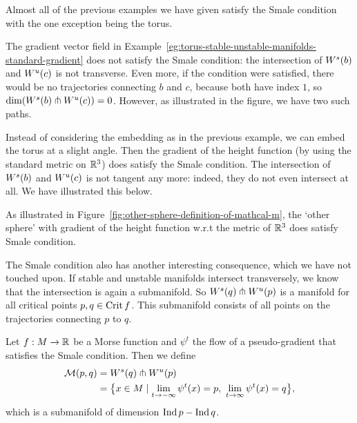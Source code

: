     Almost all of the previous examples we have given satisfy the Smale condition with the one exception being the torus.
    \begin{noneg}
        The gradient vector field in Example~\ref{eg:torus-stable-unstable-manifolds-standard-gradient} does not satisfy the Smale condition: the intersection of $W^s(b)$ and  $W^u(c)$ is not transverse.
        Even more, if the condition were satisfied, there would be no trajectories connecting $b$ and $c$, because both have index $1$, so $\dim (W^s(b) \pitchfork W^u(c)) = 0$. However, as illustrated in the figure, we have two such paths.
    \end{noneg}
    \begin{eg}
        Instead of considering the embedding as in the previous example, we can embed the torus at a slight angle.
        Then the gradient of the height function (by using the standard metric on $\mathbb{R}^3$) does satisfy the Smale condition.
        The intersection of $W^s(b)$ and  $W^u(c)$ is not tangent any more: indeed, they do not even intersect at all. We have illustrated this below.
        \label{eg:tilted-torus}
    \end{eg}
    \begin{figure}[H]
        \centering
    \end{figure}
    \begin{eg}
        As illustrated in Figure~\ref{fig:other-sphere-definition-of-mathcal-m}, the `other sphere' with gradient of the height function w.r.t the metric of $\mathbb{R}^3$ does satisfy Smale condition.  \end{eg}

The Smale condition also has another interesting consequence, which we have not touched upon.
If stable and unstable manifolds intersect transversely, we know that the intersection is again a submanifold.
So $W^s(q) \pitchfork W^u(p)$ is a manifold for all critical points $p, q \in \operatorname{Crit} f$.
This submanifold consists of all points on the trajectories connecting $p$ to $q$.
 \begin{definition}
    Let $f: M \to  \mathbb{R}$ be a Morse function and $\psi^{t}$ the flow of a pseudo-gradient that satisfies the Smale condition.
    Then we define
    \begin{align*}
        \traj{p}{q} &= \stable{q} \tcap \unstable{p}\\
                    &= \big\{
            x \in M 
            \mid 
            \lim_{t \to -\infty} \psi^{t}(x) = p, \ 
            \lim_{t \to \infty} \psi^{t}(x) = q
        \big\} 
    ,\end{align*} 
    which is a submanifold of dimension $\operatorname{Ind} p - \operatorname{Ind} q$.
\end{definition}

